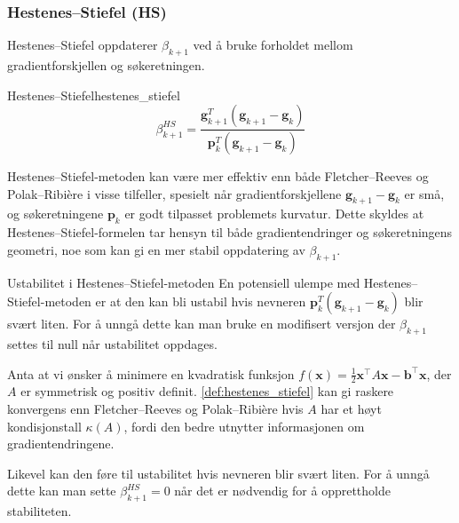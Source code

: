 \subsubsection{Hestenes--Stiefel (HS)}
Hestenes--Stiefel oppdaterer \(\beta_{k+1}\) ved å bruke forholdet mellom gradientforskjellen og søkeretningen.
\begin{definition}{Hestenes--Stiefel}{hestenes_stiefel}
	\[
		\beta_{k+1}^{HS} = \frac{\symbf{g}_{k+1}^T(\symbf{g}_{k+1} - \symbf{g}_k)}{\symbf{p}_k^T(\symbf{g}_{k+1} - \symbf{g}_k)} \tag{HS}
	\]
\end{definition}
Hestenes--Stiefel-metoden kan være mer effektiv enn både Fletcher--Reeves og Polak--Ribière i visse tilfeller, spesielt når gradientforskjellene \(\symbf{g}_{k+1} - \symbf{g}_k\) er små, og søkeretningene \(\symbf{p}_k\) er godt tilpasset problemets kurvatur.
Dette skyldes at Hestenes--Stiefel-formelen tar hensyn til både gradientendringer og søkeretningens geometri, noe som kan gi en mer stabil oppdatering av \(\beta_{k+1}\).

\begin{remark}{Ustabilitet i Hestenes--Stiefel-metoden}{}
	En potensiell ulempe med Hestenes--Stiefel-metoden er at den kan bli ustabil hvis nevneren \(\symbf{p}_k^T(\symbf{g}_{k+1} - \symbf{g}_k)\) blir svært liten. For å unngå dette kan man bruke en modifisert versjon der \(\beta_{k+1}\) settes til null når ustabilitet oppdages.
\end{remark}

\begin{example}{}{}
	Anta at vi ønsker å minimere en kvadratisk funksjon \(f(\symbf{x}) = \frac{1}{2}\symbf{x}^\top A\symbf{x} - \symbf{b}^\top \symbf{x}\), der \(A\) er symmetrisk og positiv definit.
	\ref{def:hestenes_stiefel} kan gi raskere konvergens enn Fletcher--Reeves og Polak--Ribière hvis \(A\) har et høyt kondisjonstall \(\kappa(A)\), fordi den bedre utnytter informasjonen om gradientendringene.
\end{example}

Likevel kan den føre til ustabilitet hvis nevneren blir svært liten.
For å unngå dette kan man sette \(\beta_{k+1}^{HS} = 0\) når det er nødvendig for å opprettholde stabiliteten.

